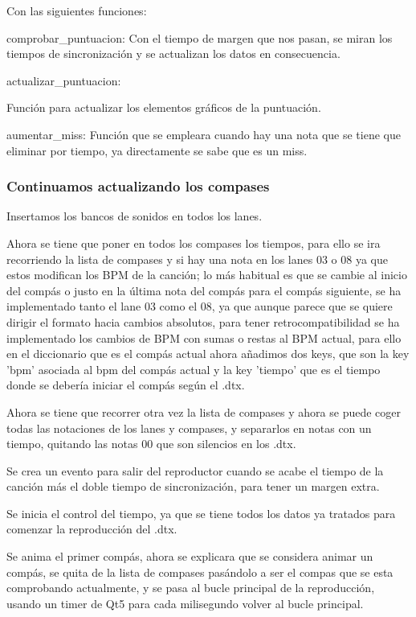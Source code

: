 \documentclass[a4paper,11pt,oneside]{book}
\begin{document}
Con las siguientes funciones:

comprobar\_puntuacion:
Con el tiempo de margen que nos pasan, se miran los tiempos de sincronización y se actualizan los datos en consecuencia.

actualizar\_puntuacion:

Función para actualizar los elementos gráficos de la puntuación.

aumentar\_miss: 
Función que se empleara cuando hay una nota que se tiene que eliminar por tiempo, ya directamente se sabe que es un miss.


\subsubsection{Continuamos actualizando los compases}

Insertamos los bancos de sonidos en todos los lanes.

Ahora se tiene que poner en todos los compases los tiempos, para ello se ira recorriendo la lista de compases y si hay una nota en los lanes 03 o 08 ya que estos modifican los BPM de la canción; lo más habitual es que se cambie al inicio del compás o justo en la última nota del compás para el compás siguiente, se ha implementado tanto el lane 03 como el 08, ya que aunque parece que se quiere dirigir el formato hacia cambios absolutos, para tener retrocompatibilidad se ha implementado los cambios de BPM con sumas o restas al BPM actual, para ello en el diccionario que es el compás actual ahora añadimos dos keys, que son la key 'bpm' asociada al bpm del compás actual y la key 'tiempo' que es el tiempo donde se debería iniciar el compás según el .dtx.

Ahora se tiene que recorrer otra vez la lista de compases y ahora se puede coger todas las notaciones de los lanes y compases, y separarlos en notas con un tiempo, quitando las notas 00 que son silencios en los .dtx.

Se crea un evento para salir del reproductor cuando se acabe el tiempo de la canción más el doble tiempo de sincronización, para tener un margen extra.

Se inicia el control del tiempo, ya que se tiene todos los datos ya tratados para comenzar la reproducción del .dtx.

Se anima el primer compás, ahora se explicara que se considera animar un compás, se quita de la lista de compases pasándolo a ser el compas que se esta comprobando actualmente, y se pasa al bucle principal de la reproducción, usando un timer de Qt5 para cada milisegundo volver al bucle principal.
\end{document}
